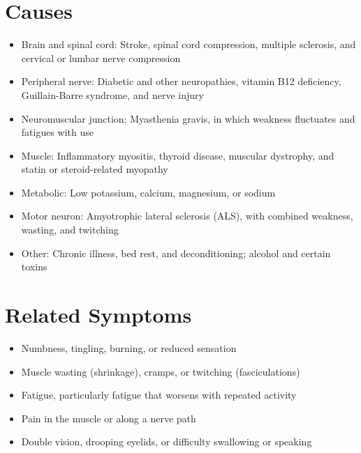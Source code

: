 \section*{Causes}
\begin{itemize}
  \item Brain and spinal cord: Stroke, spinal cord compression, multiple sclerosis, and cervical or lumbar nerve compression
  \item Peripheral nerve: Diabetic and other neuropathies, vitamin B12 deficiency, Guillain-Barre syndrome, and nerve injury
  \item Neuromuscular junction: Myasthenia gravis, in which weakness fluctuates and fatigues with use
  \item Muscle: Inflammatory myositis, thyroid disease, muscular dystrophy, and statin or steroid-related myopathy
  \item Metabolic: Low potassium, calcium, magnesium, or sodium
  \item Motor neuron: Amyotrophic lateral sclerosis (ALS), with combined weakness, wasting, and twitching
  \item Other: Chronic illness, bed rest, and deconditioning; alcohol and certain toxins
\end{itemize}

\section*{Related Symptoms}
\begin{itemize}
  \item Numbness, tingling, burning, or reduced sensation
  \item Muscle wasting (shrinkage), cramps, or twitching (fasciculations)
  \item Fatigue, particularly fatigue that worsens with repeated activity
  \item Pain in the muscle or along a nerve path
  \item Double vision, drooping eyelids, or difficulty swallowing or speaking
\end{itemize}

